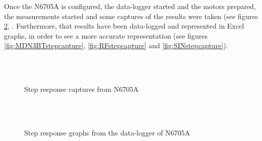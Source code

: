 Once the N6705A is configured, the data-logger started and the motors prepared, the measurements started and some captures of the results were taken (see figures \ref{fig:step}, . Furthermore, that results have been data-logged and represented in Excel graphs, in order to see a more accurate representation (see figures \ref{fig:MDN3BTstepcapture}, \ref{fig:RFstepcapture} and \ref{fig:SINstepcapture}).

\begin{figure}[H]
\centering
{} \\
 \\

\caption{Step response captures from N6705A} \label{fig:step}
\end{figure}

\begin{figure}[H]
\centering
{} \\
 \\

\caption{Step response graphs from the data-logger of N6705A} \label{fig:step}
\end{figure}


%
%
%
%
%

